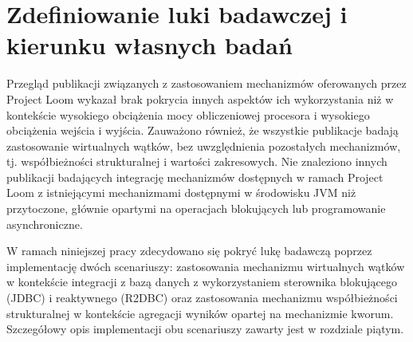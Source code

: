 \section{Zdefiniowanie luki badawczej i kierunku własnych badań}

Przegląd publikacji związanych z zastosowaniem mechanizmów oferowanych przez Project Loom wykazał brak pokrycia innych aspektów ich wykorzystania niż w kontekście wysokiego obciążenia mocy obliczeniowej procesora i wysokiego obciążenia wejścia i wyjścia. Zauważono również, że wszystkie publikacje badają zastosowanie wirtualnych wątków, bez uwzględnienia pozostałych mechanizmów, tj. współbieżności strukturalnej i wartości zakresowych. Nie znaleziono innych publikacji badających integrację mechanizmów dostępnych w ramach Project Loom z istniejącymi mechanizmami dostępnymi w środowisku JVM niż przytoczone, głównie opartymi na operacjach blokujących lub programowanie asynchroniczne.

W ramach niniejszej pracy zdecydowano się pokryć lukę badawczą poprzez implementację dwóch scenariuszy: zastosowania mechanizmu wirtualnych wątków w kontekście integracji z bazą danych z wykorzystaniem sterownika blokującego (JDBC) i reaktywnego (R2DBC) oraz zastosowania mechanizmu współbieżności strukturalnej w kontekście agregacji wyników opartej na mechanizmie kworum.
Szczegółowy opis implementacji obu scenariuszy zawarty jest w rozdziale piątym.